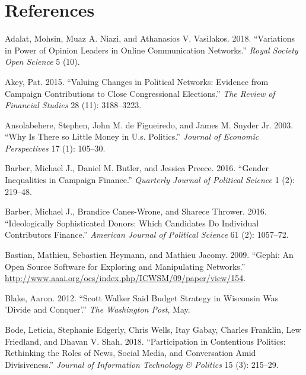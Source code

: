 \documentclass[12pt,]{article}
\begin{document}
\hypertarget{references}{%
\section*{References}\label{references}}

\hypertarget{refs}{}
\leavevmode\hypertarget{ref-adalat2018}{}%
Adalat, Mohsin, Muaz A. Niazi, and Athanasios V. Vasilakos. 2018.
``Variations in Power of Opinion Leaders in Online Communication
Networks.'' \emph{Royal Society Open Science} 5 (10).

\leavevmode\hypertarget{ref-akey2015}{}%
Akey, Pat. 2015. ``Valuing Changes in Political Networks: Evidence from
Campaign Contributions to Close Congressional Elections.'' \emph{The
Review of Financial Studies} 28 (11): 3188--3223.

\leavevmode\hypertarget{ref-ansolabehere2003}{}%
Ansolabehere, Stephen, John M. de Figueiredo, and James M. Snyder Jr.
2003. ``Why Is There so Little Money in U.s. Politics.'' \emph{Journal
of Economic Perspectives} 17 (1): 105--30.

\leavevmode\hypertarget{ref-barber2016b}{}%
Barber, Michael J., Daniel M. Butler, and Jessica Preece. 2016. ``Gender
Inequalities in Campaign Finance.'' \emph{Quarterly Journal of Political
Science} 1 (2): 219--48.

\leavevmode\hypertarget{ref-barber2016c}{}%
Barber, Michael J., Brandice Canes-Wrone, and Sharece Thrower. 2016.
``Ideologically Sophisticated Donors: Which Candidates Do Individual
Contributors Finance.'' \emph{American Journal of Political Science} 61
(2): 1057--72.

\leavevmode\hypertarget{ref-gephi}{}%
Bastian, Mathieu, Sebastien Heymann, and Mathieu Jacomy. 2009. ``Gephi:
An Open Source Software for Exploring and Manipulating Networks.''
\url{http://www.aaai.org/ocs/index.php/ICWSM/09/paper/view/154}.

\leavevmode\hypertarget{ref-blake2012}{}%
Blake, Aaron. 2012. ``Scott Walker Said Budget Strategy in Wisconsin Was
'Divide and Conquer'.'' \emph{The Washington Post}, May.

\leavevmode\hypertarget{ref-bode2018}{}%
Bode, Leticia, Stephanie Edgerly, Chris Wells, Itay Gabay, Charles
Franklin, Lew Friedland, and Dhavan V. Shah. 2018. ``Participation in
Contentious Politics: Rethinking the Roles of News, Social Media, and
Conversation Amid Divisiveness.'' \emph{Journal of Information
Technology \& Politics} 15 (3): 215--29.
\end{document}
